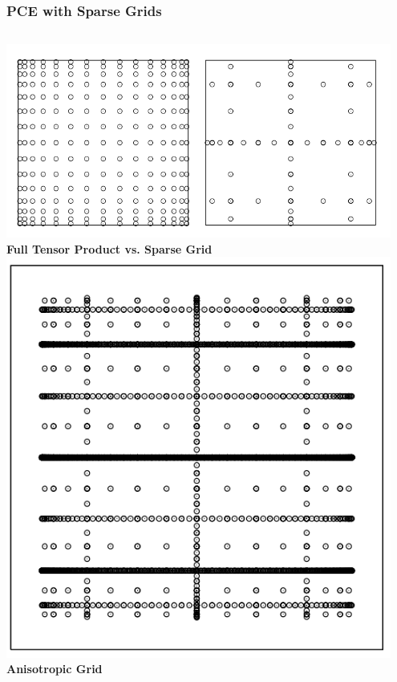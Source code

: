 \documentclass[9pt]{beamer}
\begin{document}
\begin{frame}
\frametitle{PCE with Sparse Grids}
\label{sec-2-3}


\begin{columns}[c]
    \centering
    \includegraphics[width=0.95\textwidth]{SparseGrid1} \\
    \bf{Full Tensor Product vs. Sparse Grid}
    \centering
    \includegraphics[width=0.95\textwidth]{SparseGrid2} \\
    {\bf Anisotropic Grid}
\end{columns}


\end{frame}
\end{document}
